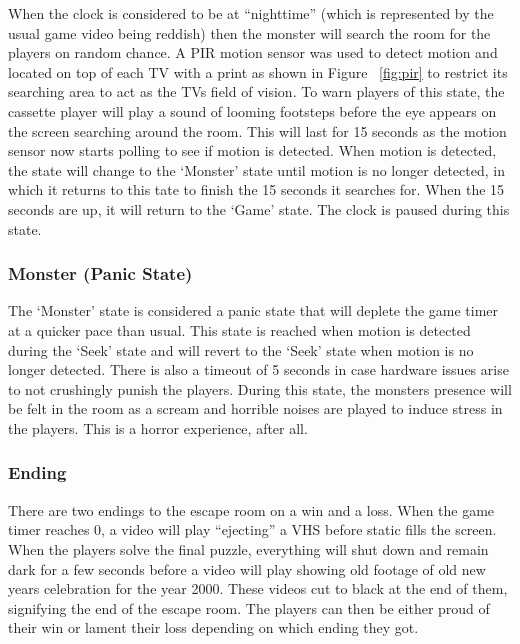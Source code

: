 \documentclass[conference]{IEEEtran}
\begin{document}
\indent When the clock is considered to be at ``nighttime'' (which is represented by the usual game video being reddish) then the monster will search
the room for the players on random chance. A PIR motion sensor was used to detect motion and located on top of each TV with a print as shown in Figure ~\ref{fig:pir} to restrict its searching area to
act as the TVs field of vision. To warn players of this state, the cassette player will play a sound of looming footsteps before the eye appears on
the screen searching around the room. This will last for 15 seconds as the motion sensor now starts polling to see if motion is detected. When motion is
detected, the state will change to the `Monster' state until motion is no longer detected, in which it returns to this tate to finish the 15 seconds it
searches for. When the 15 seconds are up, it will return to the `Game' state. The clock is paused during this state.


\subsubsection{Monster (Panic State)}

\indent The `Monster' state is considered a panic state that will deplete the game timer at a quicker pace than usual. This state is reached when motion
is detected during the `Seek' state and will revert to the `Seek' state when motion is no longer detected. There is also a timeout of 5 seconds in case
hardware issues arise to not crushingly punish the players. During this state, the monsters presence will be felt in the room as a scream and 
horrible noises are played to induce stress in the players. This is a horror experience, after all. 

\subsubsection{Ending}

\indent There are two endings to the escape room on a win and a loss. When the game timer reaches 0, a video will play ``ejecting'' a VHS before static
fills the screen. When the players solve the final puzzle, everything will shut down and remain dark for a few seconds before a video will play showing old
footage of old new years celebration for the year 2000. These videos cut to black at the end of them, signifying the end of the escape room. The players can
then be either proud of their win or lament their loss depending on which ending they got. 
\end{document}
